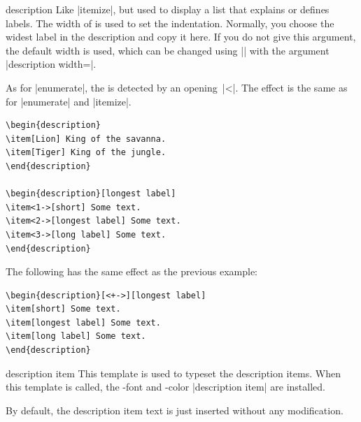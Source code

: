 \label{section-descriptions}

\begin{environment}{{description}}
  Like |itemize|, but used to display a list that explains or defines labels. The width of  is used to set the indentation. Normally, you choose the widest label in the description and copy it here. If you do not give this argument, the default width is used, which can be changed using |\setbeamersize| with the argument |description width=|.

  As for |enumerate|, the  is detected by an opening~|<|. The effect is the same as for |enumerate| and |itemize|.
  \example
\begin{verbatim}
\begin{description}
\item[Lion] King of the savanna.
\item[Tiger] King of the jungle.
\end{description}

\begin{description}[longest label]
\item<1->[short] Some text.
\item<2->[longest label] Some text.
\item<3->[long label] Some text.
\end{description}
\end{verbatim}

  \example
  The following has the same effect as the previous example:
\begin{verbatim}
\begin{description}[<+->][longest label]
\item[short] Some text.
\item[longest label] Some text.
\item[long label] Some text.
\end{description}
\end{verbatim}

  \begin{element}{description item}\yes\yes\yes
    This template is used to typeset the description items. When this template is called, the \beamer-font and -color |description item| are installed.

    \begin{templateoptions}
      By default, the description item text is just inserted without any modification.
    \end{templateoptions}


\end{element}
\end{environment}
